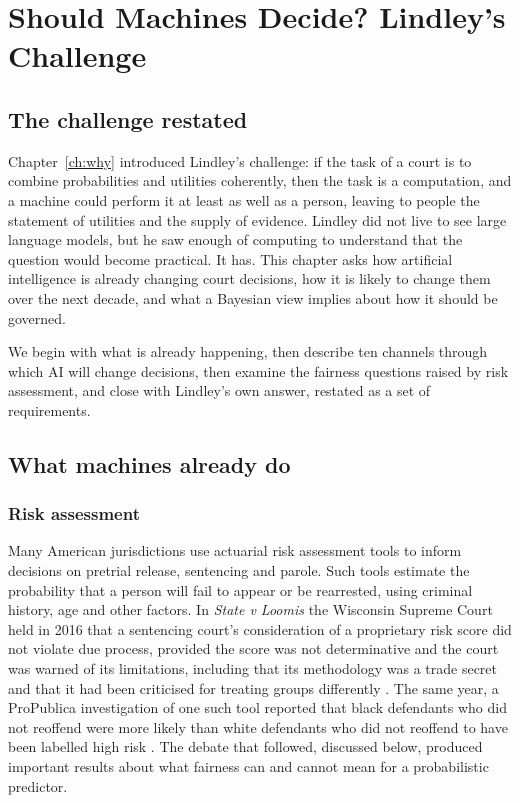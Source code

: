 \chapter{Should Machines Decide? Lindley's Challenge}
\label{ch:lindleyai}

\section{The challenge restated}

Chapter~\ref{ch:why} introduced Lindley's challenge: if the task of a court is to combine probabilities and utilities coherently, then the task is a computation, and a machine could perform it at least as well as a person, leaving to people the statement of utilities and the supply of evidence. Lindley did not live to see large language models, but he saw enough of computing to understand that the question would become practical. It has. This chapter asks how artificial intelligence is already changing court decisions, how it is likely to change them over the next decade, and what a Bayesian view implies about how it should be governed.

We begin with what is already happening, then describe ten channels through which AI will change decisions, then examine the fairness questions raised by risk assessment, and close with Lindley's own answer, restated as a set of requirements.

\section{What machines already do}

\subsection{Risk assessment}

Many American jurisdictions use actuarial risk assessment tools to inform decisions on pretrial release, sentencing and parole. Such tools estimate the probability that a person will fail to appear or be rearrested, using criminal history, age and other factors. In \emph{State v Loomis} the Wisconsin Supreme Court held in 2016 that a sentencing court's consideration of a proprietary risk score did not violate due process, provided the score was not determinative and the court was warned of its limitations, including that its methodology was a trade secret and that it had been criticised for treating groups differently \citep{loomis2016}. The same year, a ProPublica investigation of one such tool reported that black defendants who did not reoffend were more likely than white defendants who did not reoffend to have been labelled high risk \citep{angwin2016}. The debate that followed, discussed below, produced important results about what fairness can and cannot mean for a probabilistic predictor.

